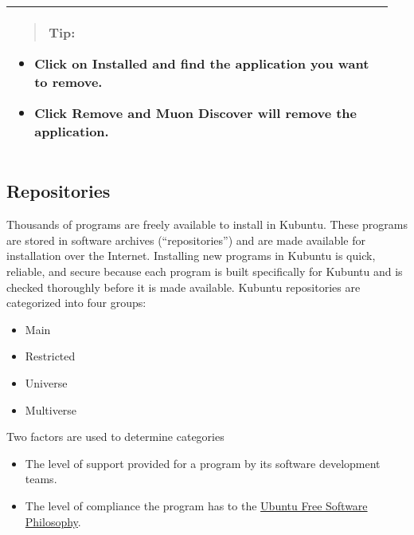 \documentclass[letterpaper,10pt,english]{sphinxmanual}
\begin{document}
\noindent\begin{tabular}{|p{0.950\linewidth}|}
\hline
\begin{quote}

Tip:
\end{quote}
\begin{itemize}
\item {} 
Click on Installed and find the application you want to remove.

\item {} 
Click Remove and Muon Discover will remove the application.

\end{itemize}
\\
\hline\end{tabular}



\subsection{Repositories}
\label{docs/advanced:repositories}
Thousands of programs are freely available to install in Kubuntu. These programs are stored in software archives (``repositories'') and are made available for installation over the Internet. Installing new programs in Kubuntu is quick, reliable, and secure because each program is built specifically for Kubuntu and is checked thoroughly before it is made available. Kubuntu repositories are categorized into four groups:
\begin{itemize}
\item {} 
Main

\item {} 
Restricted

\item {} 
Universe

\item {} 
Multiverse

\end{itemize}

Two factors are used to determine categories
\begin{itemize}
\item {} 
The level of support provided for a program by its software development teams.

\item {} 
The level of compliance the program has to the \href{http://www.ubuntu.com/about/about-ubuntu/our-philosophy}{Ubuntu Free Software Philosophy}.

\end{itemize}
\end{document}
